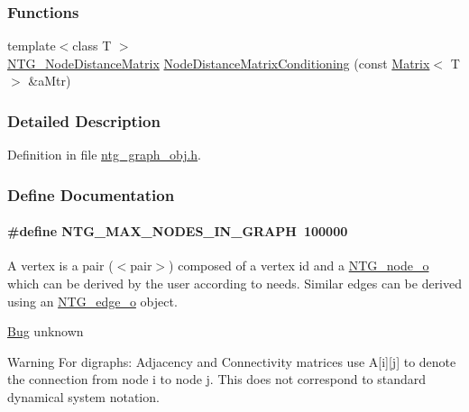 \subsubsection*{Functions}
\begin{DoxyCompactItemize}
\item 
{\footnotesize template$<$class T $>$ }\\\hyperlink{class_t_n_t_1_1_matrix}{NTG\_\-NodeDistanceMatrix} \hyperlink{ntg__graph__obj_8h_a0e8335ce2b5666d8e7f1b544451a6a42}{NodeDistanceMatrixConditioning} (const \hyperlink{class_t_n_t_1_1_matrix}{Matrix}$<$ T $>$ \&aMtr)
\end{DoxyCompactItemize}


\subsubsection{Detailed Description}


Definition in file \hyperlink{ntg__graph__obj_8h_source}{ntg\_\-graph\_\-obj.h}.



\subsubsection{Define Documentation}
\paragraph[{NTG\_\-MAX\_\-NODES\_\-IN\_\-GRAPH}]{\setlength{\rightskip}{0pt plus 5cm}\#define NTG\_\-MAX\_\-NODES\_\-IN\_\-GRAPH~100000}\hfill\label{ntg__graph__obj_8h_a07e4172ed3953fb590c6ab6944ed7449}
A vertex is a pair ($<$pair$>$) composed of a vertex id and a \hyperlink{class_n_t_g__node__o}{NTG\_\-node\_\-o} which can be derived by the user according to needs. Similar edges can be derived using an \hyperlink{class_n_t_g__edge__o}{NTG\_\-edge\_\-o} object.

\begin{Desc}
\item[\hyperlink{bug__bug000085}{Bug}]unknown \end{Desc}
\begin{DoxyWarning}{Warning}
For digraphs: Adjacency and Connectivity matrices use A\mbox{[}i\mbox{]}\mbox{[}j\mbox{]} to denote the connection from node i to node j. This does not correspond to standard dynamical system notation. 
\end{DoxyWarning}


